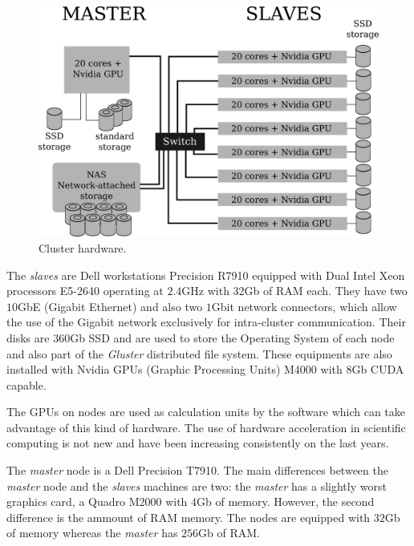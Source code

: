 \documentclass[twoside,a4paper,12pt,english]{inac19}
\begin{document}
\begin{figure}[h] %
  \centering\includegraphics[scale=0.7]{images/cluster-topologico.png}
  \caption{Cluster hardware.}
  \label{fig:cluster}
\end{figure}

The \textit{slaves} are Dell workstations Precision R7910 equipped
with Dual Intel{\textregistered} Xeon{\textregistered} processors E5-2640 operating at $2.4$GHz with
$32$Gb of RAM each. They have two $10$GbE (Gigabit Ethernet) and also two $1$Gbit network connectors, which
allow the use of the Gigabit network exclusively for intra-cluster communication. Their disks are $360$Gb SSD
and are used to store the Operating System of each node and also part of the \textit{Gluster} distributed
file system. These equipments are also installed with Nvidia{\textregistered} GPUs (Graphic Processing Units) M4000{\textregistered} with $8$Gb CUDA\cite{CUDA} capable.

The GPUs on nodes are used as calculation units by the software which can take advantage of this kind of hardware.
The use of hardware acceleration in scientific computing is not new and have been increasing consistently on the
last years\cite{accelerators}.


The \textit{master} node is a Dell Precision T7910. The main
differences between the \textit{master} node and the \textit{slaves} machines are two: the \textit{master} has
a slightly worst graphics card, a Quadro{\textregistered} M2000 with $4$Gb of memory. However, the second difference
is the ammount of RAM memory. The nodes are equipped with $32$Gb of memory whereas the \textit{master} has
$256$Gb of RAM.
\end{document}

